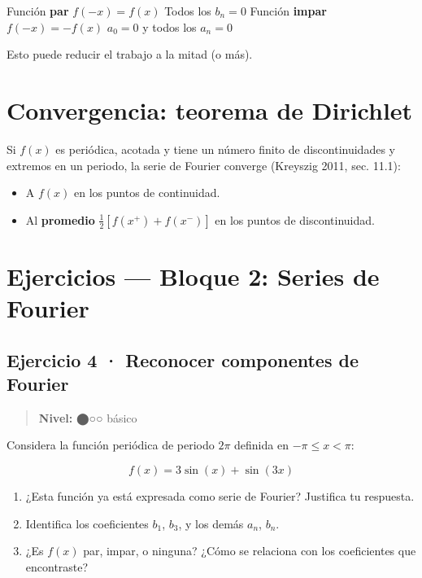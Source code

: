 \documentclass[
  letterpaper,
  DIV=11,
  numbers=noendperiod]{scrreprt}
\providecommand{\tightlist}{%
  \setlength{\itemsep}{0pt}\setlength{\parskip}{0pt}}
\begin{document}
\textbar\textbar\textbar\textbar{} \textbar{} Función \textbf{par}
\textbar{} \(f(-x) = f(x)\) \textbar{} Todos los \(b_n = 0\) \textbar{}
\textbar{} Función \textbf{impar} \textbar{} \(f(-x) = -f(x)\)
\textbar{} \(a_0 = 0\) y todos los \(a_n = 0\) \textbar{}

Esto puede reducir el trabajo a la mitad (o más).

\section{Convergencia: teorema de
Dirichlet}\label{convergencia-teorema-de-dirichlet}

Si \(f(x)\) es periódica, acotada y tiene un número finito de
discontinuidades y extremos en un periodo, la serie de Fourier converge
(Kreyszig 2011, sec. 11.1):

\begin{itemize}
\tightlist
\item
  A \(f(x)\) en los puntos de continuidad.
\item
  Al \textbf{promedio} \(\tfrac{1}{2}[f(x^+) + f(x^-)]\) en los puntos
  de discontinuidad.
\end{itemize}

\section{Ejercicios --- Bloque 2: Series de
Fourier}\label{ejercicios-bloque-2-series-de-fourier}

\subsection*{Ejercicio 4 · Reconocer componentes de
Fourier}\label{ejercicio-4-reconocer-componentes-de-fourier}

\begin{quote}
\textbf{Nivel:} ⬤○○ básico
\end{quote}

Considera la función periódica de periodo \(2\pi\) definida en
\(-\pi \le x < \pi\):

\[
f(x) = 3\sin(x) + \sin(3x)
\]

\begin{enumerate}
\def\labelenumi{\alph{enumi})}
\tightlist
\item
  ¿Esta función ya está expresada como serie de Fourier? Justifica tu
  respuesta.
\item
  Identifica los coeficientes \(b_1\), \(b_3\), y los demás \(a_n\),
  \(b_n\).
\item
  ¿Es \(f(x)\) par, impar, o ninguna? ¿Cómo se relaciona con los
  coeficientes que encontraste?
\end{enumerate}
\end{document}
